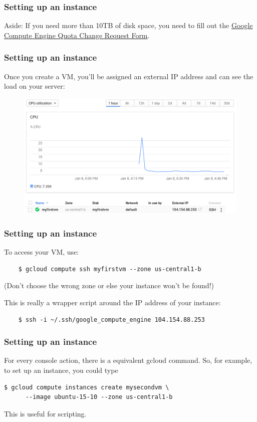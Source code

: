 \documentclass[9pt]{beamer}
\begin{document}
\begin{frame}[fragile]
  \frametitle{Setting up an instance}
  Aside: If you need more than 10TB of disk space, you need to fill out the \href{https://docs.google.com/a/google.com/forms/d/1vb2MkAr9JcHrp6myQ3oTxCyBv2c7Iyc5wqIKqE3K4IE/viewform}{Google Compute Engine Quota Change Request Form}.
\end{frame}

\begin{frame}[fragile]
  \frametitle{Setting up an instance}
  Once you create a VM, you'll be assigned an external IP address and can see the load on your server:
  \begin{figure}
    \includegraphics[scale=0.2]{figures/VMUp.png}
  \end{figure}
\end{frame}

\begin{frame}[fragile]
  \frametitle{Setting up an instance}
  To access your VM, use:
  \begin{verbatim}
    $ gcloud compute ssh myfirstvm --zone us-central1-b
  \end{verbatim}
  (Don't choose the wrong zone or else your instance won't be found!)

  This is really a wrapper script around the IP address of your instance:
  \begin{verbatim}
    $ ssh -i ~/.ssh/google_compute_engine 104.154.88.253
  \end{verbatim}
\end{frame}

\begin{frame}[fragile]
\frametitle{Setting up an instance}
For every console action, there is a equivalent gcloud command. So, for example, to set up an instance, you could type
\begin{verbatim}
$ gcloud compute instances create mysecondvm \
      --image ubuntu-15-10 --zone us-central1-b
\end{verbatim}
This is useful for scripting.
\end{frame}
\end{document}
